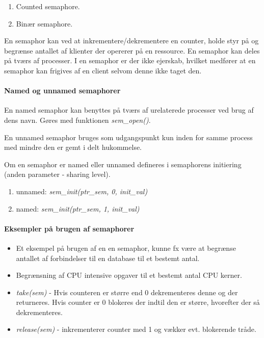 \begin{enumerate}
	\item Counted semaphore.
	\item Binær semaphore.
\end{enumerate}

En semaphor kan ved at inkrementere/dekrementere en counter, holde styr på og begrænse antallet af klienter der opererer på en ressource. En semaphor kan deles på tværs af processer. I en semaphor er der ikke ejerskab, hvilket medfører at en semaphor kan frigives af en client selvom denne ikke taget den.

\paragraph{Named og unnamed semaphorer}
En named semaphor kan benyttes på tværs af urelaterede processer ved brug af dens navn. Gøres med funktionen \textit{sem\_open()}.

En unnamed semaphor bruges som udgangspunkt kun inden for samme process med mindre den er gemt i delt hukommelse. 

Om en semaphor er named eller unnamed defineres i semaphorens initiering (anden parameter - sharing level).

\begin{enumerate}
\item unnamed: \textit{sem\_init(ptr\_sem, 0, init\_val)}
\item named: \textit{sem\_init(ptr\_sem, 1, init\_val)}
\end{enumerate}

\paragraph{Eksempler på brugen af semaphorer}

\begin{itemize}
	\item Et eksempel på brugen af en en semaphor, kunne fx være at begrænse antallet af forbindelser til en database til et bestemt antal.
	\item Begrænsning af CPU intensive opgaver til et bestemt antal CPU kerner.
	\item \textit{take(sem)} - Hvis counteren er større end 0 dekrementeres denne og der returneres. Hvis counter er 0 blokeres der indtil den er større, hvorefter der så dekrementeres.
	\item \textit{release(sem)} - inkrementerer counter med 1 og vækker evt. blokerende tråde.
\end{itemize}

